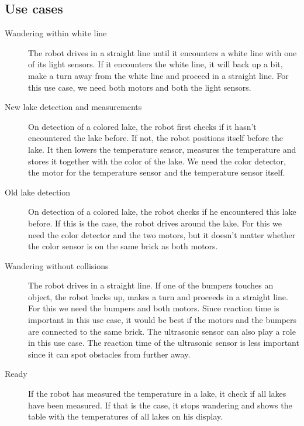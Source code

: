 \documentclass[10pt,a4paper]{article}
\begin{document}
\subsection*{Use cases}
\begin{description}
\item[Wandering within white line] The robot drives in a straight line until it encounters a white line with one of its light sensors. If it encounters the white line, it will back up a bit, make a turn away from the white line and proceed in a straight line. For this use case, we need both motors and both the light sensors.
\item[New lake detection and measurements] On detection of a colored lake, the robot first checks if it hasn't encountered the lake before. If not, the robot positions itself before the lake. It then lowers the temperature sensor, measures the temperature and stores it together with the color of the lake. We need the color detector, the motor for the temperature sensor and the temperature sensor itself.
\item[Old lake detection] On detection of a colored lake, the robot checks if he encountered this lake before. If this is the case, the robot drives around the lake. For this we need the color detector and the two motors, but it doesn't matter whether the color sensor is on the same brick as both motors.
\item[Wandering without collisions] The robot drives in a straight line. If one of the bumpers touches an object, the robot backs up, makes a turn and proceeds in a straight line. For this we need the bumpers and both motors. Since reaction time is important in this use case, it would be best if the motors and the bumpers are connected to the same brick. The ultrasonic sensor can also play a role in this use case. The reaction time of the ultrasonic sensor is less important since it can spot obstacles from further away. %
\item[Ready] If the robot has measured the temperature in a lake, it check if all lakes have been measured. If that is the case, it stops wandering and shows the table with the temperatures of all lakes on his display.\\
\end{description}
\end{document}
